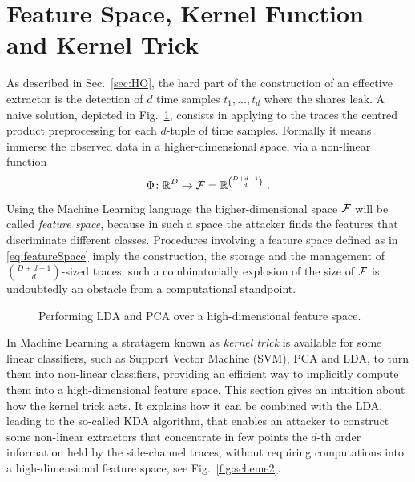 \section{Feature Space, Kernel Function and Kernel Trick}\label{sec:kernel_trick}


As described in Sec.~\ref{sec:HO}, the hard part of the construction of an effective extractor  is the detection of $d$ time samples $t_1,\dots,t_d$ where the shares leak. A naive solution, depicted in Fig.~\ref{fig:scheme1}, consists in applying to the traces the centred product preprocessing for each $d$-tuple of time samples. Formally it means immerse the observed data in a higher-dimensional space, via a non-linear function
\begin{equation}\label{eq:featureSpace}
\Phi \colon \mathbb{R}^D \rightarrow \mathcal{F} = \mathbb{R}^{{D+d-1}\choose{d}} \mbox{ .}
\end{equation}
 Using the Machine Learning language the higher-dimensional space $\mathcal{F}$ will be called \emph{feature space}, because in such a space the attacker finds the features that discriminate different classes. Procedures involving a feature space defined as in \eqref{eq:featureSpace} imply the construction, the storage and the management of ${D+d-1}\choose{d}$-sized traces; such a combinatorially explosion of the size of $\mathcal{F}$ is undoubtedly an obstacle from a computational standpoint.
 
\begin{figure}
\centering
{
}
\caption{Performing LDA and PCA over a high-dimensional feature space.}\label{fig:scheme1}
\end{figure} 
 
 In Machine Learning a stratagem known as \emph{kernel trick} is available for some linear classifiers, such as Support Vector Machine (SVM), PCA and LDA, to turn them into non-linear classifiers, providing an efficient way to implicitly compute them into a high-dimensional feature space. This section gives an intuition about how the kernel trick acts. It explains how it can be combined with the LDA, leading to the so-called KDA algorithm, that enables an attacker to construct some non-linear extractors that concentrate in few points the $d$-th order information held by the side-channel traces, without requiring computations into a high-dimensional feature space, see Fig.~\ref{fig:scheme2}. 

